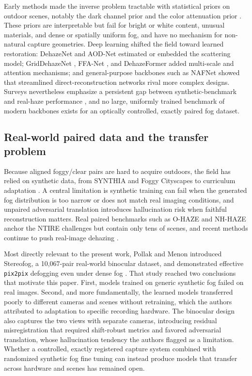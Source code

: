 \documentclass{optica-article}
\begin{document}
Early methods made the inverse problem tractable with statistical
priors on outdoor scenes, notably the dark channel prior
\cite{he2010single} and the color attenuation prior
\cite{zhu2014single}. These priors are interpretable but fail for
bright or white content, unusual materials, and dense or
spatially uniform fog, and have no mechanism for non-natural
capture geometries. Deep learning shifted the field toward learned
restoration: DehazeNet \cite{cai2016dehazenet} and AOD-Net
\cite{li2017aod} estimated or embedded the scattering model;
GridDehazeNet \cite{liu2019griddehazenet}, FFA-Net
\cite{qin2020ffa}, and DehazeFormer \cite{song2023dehazeformer}
added multi-scale and attention mechanisms; and general-purpose
backbones such as NAFNet \cite{chen2022simple} showed that
streamlined direct-reconstruction networks rival more complex
designs. Surveys nevertheless emphasize a persistent gap between
synthetic-benchmark and real-haze performance
\cite{gui2021comprehensive}, and no large, uniformly trained
benchmark of modern backbones exists for an optically controlled,
exactly paired fog dataset.
 
\subsection{Real-world paired data and the transfer problem}
 
Because aligned foggy/clear pairs are hard to acquire outdoors, the
field has relied on synthetic data, from SYNTHIA
\cite{ros2016synthia} and Foggy Cityscapes
\cite{sakaridis2018semantic} to curriculum adaptation
\cite{sakaridis2018model}. A central limitation is synthetic training can fail when the generated fog distribution is too narrow or does not match real imaging conditions, and unpaired adversarial translation \cite{isola2017pix2pix,zhu2017unpaired} introduces hallucination
risk when faithful reconstruction matters. Real paired benchmarks
such as O-HAZE \cite{ancuti2018ohaze} and NH-HAZE
\cite{ancuti2020nhhaze} anchor the NTIRE challenges
\cite{ancuti2021ntire,histofusionnet2026} but contain only tens of
scenes, and recent methods continue to push real-image dehazing
\cite{chen2024pttd,chen2025dehazexl}.
 
Most directly relevant to the present work, Pollak and Menon
introduced Stereofog, a 10{,}067-pair real-world binocular dataset,
and demonstrated effective \texttt{pix2pix} defogging even under
dense fog \cite{pollak2024stereofog}. That study reached two
conclusions that motivate this paper. First, models trained on
generic synthetic fog failed on real images. Second, and more
fundamentally, the learned models transferred poorly to different
cameras and scenes without retraining, which the authors attributed
to adaptation to specific recording hardware. The binocular design
also captures the two views with separate cameras, introducing
residual misregistration that required shift-robust metrics and
favored adversarial translation, whose hallucination tendency the
authors flagged as a limitation. Whether a controlled,
exactly registered capture system combined with randomized synthetic fog fine tuning can instead produce models that transfer across hardware and scenes has remained open.
 
\end{document}
